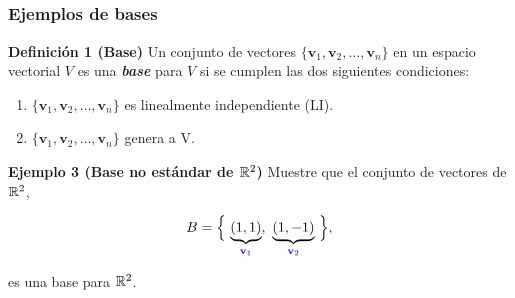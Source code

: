 \subsection{}

{\nologo
\begin{frame}\frametitle{Ejemplos de bases}

\begin{block}{\textbf{Definición 1 (Base)}}
	\justifying
	Un conjunto de vectores $\{\mathbf{v}_1, \mathbf{v}_2, \hdots , \mathbf{v}_n \}$ en un espacio vectorial $V$ es 
	una \textbf{\textit{base}} para $V$ si se cumplen las dos siguientes condiciones:
	\begin{enumerate}
		\item[\labelname{$a$}] $\{\mathbf{v}_1, \mathbf{v}_2, \hdots , \mathbf{v}_n \}$ es linealmente independiente (LI).
		\item[\labelname{$b$}] $\{\mathbf{v}_1, \mathbf{v}_2, \hdots , \mathbf{v}_n \}$ genera a V.
	\end{enumerate}
\end{block}


\begin{ej}{\textbf{Ejemplo 3 (Base no estándar de $\mathbb{R}^2$)}} \justifying
	Muestre que el conjunto de vectores de $\mathbb{R}^2$,
	
	\vspace{-2mm}
	\[
	B = \Big\{ \, \underbrace{(1,1)}_{\color{blue}\mathbf{v}_1}, \ \underbrace{(1,-1)}_{\color{blue}\mathbf{v}_2} \, \Big\},
	\]
	
	\vspace{-2mm}
	es una base para $\mathbb{R}^2$.
\end{ej}	

\end{frame}
}


\subsection{}

